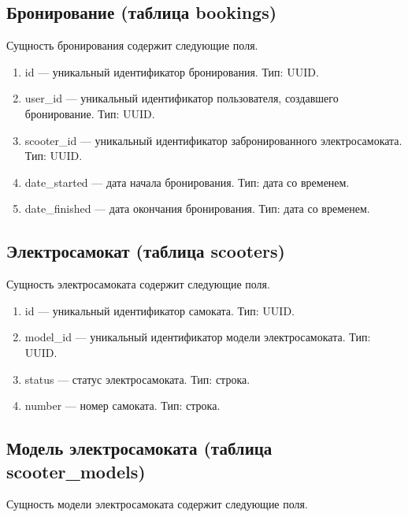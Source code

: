 \subsection{Бронирование (таблица bookings)}

Сущность бронирования содержит следующие поля.

\begin{enumerate}
	\item id --- уникальный идентификатор бронирования. Тип: UUID.
	\item user\_id --- уникальный идентификатор пользователя, создавшего бронирование.
	      Тип: UUID.
	\item scooter\_id --- уникальный идентификатор забронированного электросамоката. Тип:
	      UUID.
	\item date\_started --- дата начала бронирования. Тип: дата со временем.
	\item date\_finished --- дата окончания бронирования. Тип: дата со временем.
\end{enumerate}

\subsection{Электросамокат (таблица scooters)}

Сущность электросамоката содержит следующие поля.

\begin{enumerate}
	\item id --- уникальный идентификатор самоката. Тип: UUID.
	\item model\_id --- уникальный идентификатор модели электросамоката. Тип: UUID.
	\item status --- статус электросамоката. Тип: строка.
	\item number --- номер самоката. Тип: строка.
\end{enumerate}

\subsection{Модель электросамоката (таблица scooter\_models)}

Сущность модели электросамоката содержит следующие поля.

